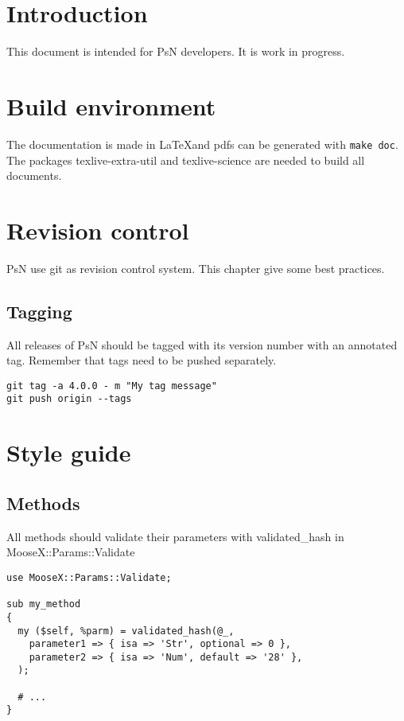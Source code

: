 
\usepackage{hyperref}



\maketitle

  
\section{Introduction}

This document is intended for PsN developers. It is work in progress.

\section{Build environment}
The documentation is made in \LaTeX and pdfs can be generated with \verb|make doc|. The
packages texlive-extra-util and texlive-science are needed to build all documents.

\section{Revision control}
PsN use git as revision control system. This chapter give some best practices.

\subsection{Tagging}
All releases of PsN should be tagged with its version number with an annotated tag. Remember
that tags need to be pushed separately.
\begin{verbatim}
git tag -a 4.0.0 - m "My tag message"
git push origin --tags
\end{verbatim}

\section{Style guide}

\subsection{Methods}

All methods should validate their parameters with validated\_hash in MooseX::Params::Validate

\begin{verbatim}
use MooseX::Params::Validate;

sub my_method
{
  my ($self, %parm) = validated_hash(@_,
    parameter1 => { isa => 'Str', optional => 0 },
    parameter2 => { isa => 'Num', default => '28' },
  );

  # ...
}
\end{verbatim}


